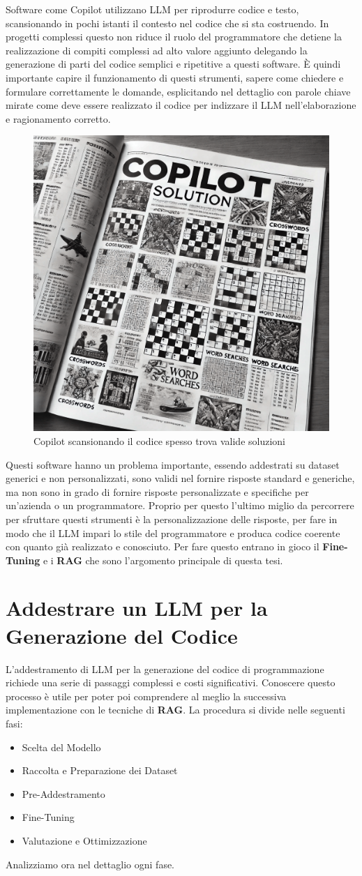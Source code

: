 \documentclass[12pt,a4paper,openright,twoside]{book}
\begin{document}
Software come Copilot utilizzano LLM per riprodurre codice e testo, scansionando in pochi istanti il contesto nel codice che si sta costruendo.
In progetti complessi questo non riduce il ruolo del programmatore che detiene la realizzazione di compiti complessi ad alto valore aggiunto delegando la generazione di parti del codice semplici e ripetitive a questi software.
\`E quindi importante capire il funzionamento di questi strumenti, sapere come chiedere e formulare correttamente le domande, esplicitando nel dettaglio con parole chiave mirate come deve essere realizzato il codice per indizzare il \ac{LLM} nell'elaborazione e ragionamento corretto.
\begin{figure}[h]
    \centering
    \includegraphics[width=0.5\linewidth]{figures/copilotsolutionSettimanaEnigmistica.png}
    \caption{Copilot scansionando il codice spesso trova valide soluzioni}
    \label{fig:Copilot-Solution}
\end{figure}
Questi software hanno un problema importante, essendo addestrati su dataset generici e non personalizzati, sono validi nel fornire risposte standard e generiche, ma non sono in grado di fornire risposte personalizzate e specifiche per un'azienda o un programmatore.
Proprio per questo l'ultimo miglio da percorrere per sfruttare questi strumenti è la personalizzazione delle risposte, per fare in modo che il LLM impari lo stile del programmatore e produca codice coerente con quanto già realizzato e conosciuto.
Per fare questo entrano in gioco il \textbf{Fine-Tuning} e i \textbf{RAG} che sono l'argomento principale di questa tesi.
\chapter{Addestrare un LLM per la Generazione del Codice}

L'addestramento di LLM per la generazione del codice di programmazione richiede una serie di passaggi complessi e costi significativi.
Conoscere questo processo è utile per poter poi comprendere al meglio la successiva implementazione con le tecniche di \textbf{RAG}.
La procedura si divide nelle seguenti fasi:
\begin{itemize}
    \item Scelta del Modello
    \item Raccolta e Preparazione dei Dataset
    \item Pre-Addestramento
    \item Fine-Tuning
    \item Valutazione e Ottimizzazione
\end{itemize}
Analizziamo ora nel dettaglio ogni fase.
\end{document}
